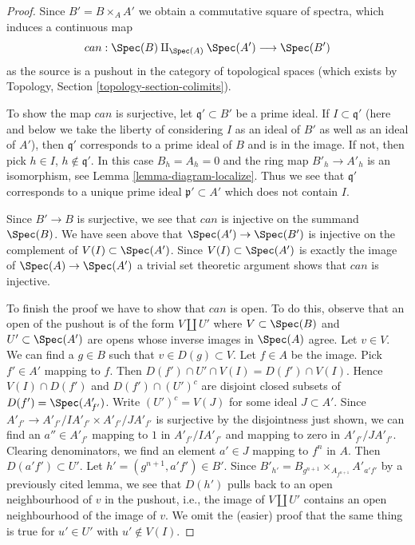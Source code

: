 \begin{proof}
Since $B' = B \times_A A'$ we obtain a commutative square of
spectra, which induces a continuous map
$$
can : \Spec(B) \amalg_{\Spec(A)} \Spec(A') \longrightarrow \Spec(B')
$$
as the source is a pushout in the category
of topological spaces (which exists by
Topology, Section \ref{topology-section-colimits}).

\medskip\noindent
To show the map $can$ is surjective, let $\mathfrak q' \subset B'$ be a prime
ideal. If $I \subset \mathfrak q'$ (here and below we take the liberty
of considering $I$ as an ideal of $B'$ as well as an ideal of $A'$),
then $\mathfrak q'$ corresponds to a prime ideal of $B$ and is in the image.
If not, then pick $h \in I$, $h \not \in \mathfrak q'$.
In this case $B_h = A_h = 0$
and the ring map $B'_h \to A'_h$ is an isomorphism, see
Lemma \ref{lemma-diagram-localize}. Thus we see that
$\mathfrak q'$ corresponds to a unique prime ideal $\mathfrak p' \subset A'$
which does not contain $I$.

\medskip\noindent
Since $B' \to B$ is surjective, we see that $can$ is injective on
the summand $\Spec(B)$. We have seen above that $\Spec(A') \to \Spec(B')$
is injective on the complement of $V(I) \subset \Spec(A')$. Since
$V(I) \subset \Spec(A')$ is exactly the image of $\Spec(A) \to \Spec(A')$
a trivial set theoretic argument shows that $can$ is injective.

\medskip\noindent
To finish the proof we have to show that $can$ is open. To do this, observe
that an open of the pushout is of the form $V \amalg U'$ where
$V \subset \Spec(B)$ and $U' \subset \Spec(A')$ are opens whose inverse
images in $\Spec(A)$ agree. Let $v \in V$. We can find a $g \in B$
such that $v \in D(g) \subset V$. Let $f \in A$ be the image.
Pick $f' \in A'$ mapping to $f$. Then
$D(f') \cap U' \cap V(I) = D(f') \cap V(I)$.
Hence $V(I) \cap D(f')$ and $D(f') \cap (U')^c$ are disjoint closed
subsets of $D(f') = \Spec(A'_{f'})$. Write $(U')^c = V(J)$
for some ideal $J \subset A'$. Since
$A'_{f'} \to A'_{f'}/IA'_{f'} \times A'_{f'}/JA'_{f'}$
is surjective by the disjointness just shown, we can find an $a'' \in A'_{f'}$
mapping to $1$ in $A'_{f'}/IA'_{f'}$ and mapping to zero in
$A'_{f'}/JA'_{f'}$. Clearing denominators, we find an element
$a' \in J$ mapping to $f^n$ in $A$. Then $D(a'f') \subset U'$.
Let $h' = (g^{n + 1}, a'f') \in B'$.
Since $B'_{h'} = B_{g^{n + 1}} \times_{A_{f^{n + 1}}} A'_{a'f'}$ by a previously
cited lemma, we see that $D(h')$ pulls back to an open neighbourhood
of $v$ in the pushout, i.e., the image of $V \amalg U'$ contains
an open neighbourhood of the image of $v$. We omit the (easier) proof that
the same thing is true for $u' \in U'$ with $u' \not \in V(I)$.
\end{proof}


